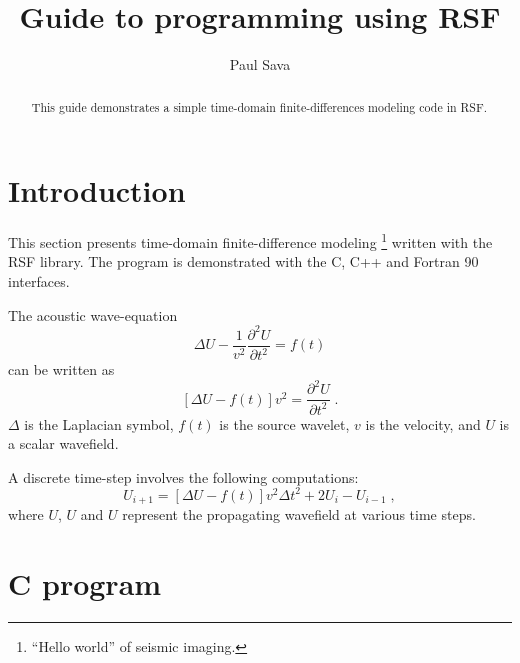 \title{Guide to programming using RSF}
\author{Paul Sava}

\maketitle

\begin{abstract}

  This guide demonstrates a simple time-domain
  finite-differences modeling code in RSF.

\end{abstract}

\section{Introduction}
This section presents time-domain 
finite-difference modeling
\footnote{
``Hello world'' of seismic imaging.
}
written with the RSF library.
The program is demonstrated with the C, C++ and Fortran 90 interfaces.

The acoustic wave-equation
\begin{equation}
\Delta U - \frac{1}{v^2} \frac{\partial^2 U}{\partial t^2} = f(t)
\end{equation}
can be written as
\begin{equation}
\left[ \Delta U - f(t) \right] v^2 =
\frac{\partial^2 U}{\partial t^2} \;.
\end{equation}
$\Delta$ is the Laplacian symbol,
$f(t)$ is the source wavelet,
$v$ is the velocity, and
$U$ is a scalar wavefield.

A discrete time-step involves the following computations:
\begin{equation}
U_{i+1} = \left[ \Delta U -f(t) \right] v^2 \Delta t^2 + 2 U_{i} - U_{i-1} \;,
\end{equation}
where $U$, $U$ and $U$
represent the propagating wavefield at various time steps.

\newpage
\section{C program}
\def\FDMc{\RSF/user/savap/rsfdemo/AFDMc__.c}
\lstset{language=c,numbers=left,numberstyle=\tiny,showstringspaces=false}

\tiny

\normalsize
\newpage

